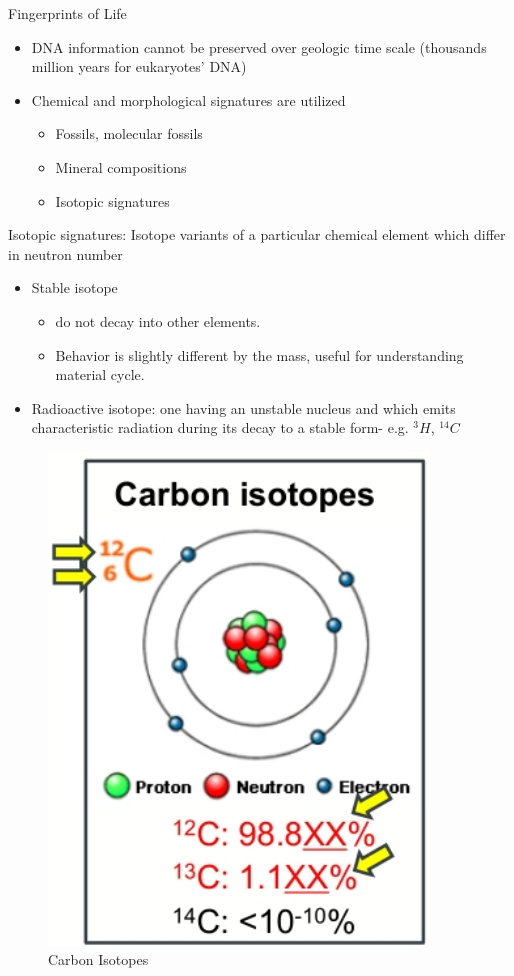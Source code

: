 \documentclass[]{article}
\begin{document}
Fingerprints of Life
\begin{itemize}
	\item  DNA information cannot be preserved over geologic time
	scale (thousands ~ million years for eukaryotes' DNA)
	\item Chemical and morphological signatures are utilized
	\begin{itemize}
		\item  Fossils, molecular fossils
		\item Mineral compositions
		\item Isotopic signatures
	\end{itemize}
\end{itemize}

Isotopic signatures: Isotope variants of a particular chemical element
which differ in neutron number
\begin{itemize}
	\item  Stable isotope
	\begin{itemize}
		\item do not decay into other
		elements.
		\item Behavior is slightly different by the
		mass, useful for understanding
		material cycle.
	\end{itemize}
	\item Radioactive isotope: one having an unstable nucleus and
	which emits characteristic radiation during
	its decay to a stable form- e.g. $^3H$, $^14C$
\end{itemize}

\begin{figure}[H]
	\caption{Carbon Isotopes}\label{fig:CarbonIsotopes}
	\includegraphics[width=0.9\textwidth]{CarbonIsotopes}
\end{figure}
\end{document}
